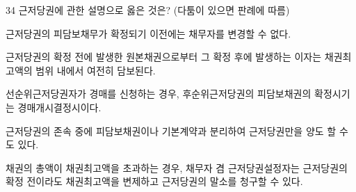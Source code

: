 \begin{question}{34}
근저당권에 관한 설명으로 옳은 것은? (다툼이 있으면 판례에 따름)
\begin{choices}
  \item 근저당권의 피담보채무가 확정되기 이전에는 채무자를 변경할 수 없다.
  \item 근저당권의 확정 전에 발생한 원본채권으로부터 그 확정 후에 발생하는 이자는 채권최고액의 범위 내에서 여전히 담보된다.
  \item 선순위근저당권자가 경매를 신청하는 경우, 후순위근저당권의 피담보채권의 확정시기는 경매개시결정시이다.
  \item 근저당권의 존속 중에 피담보채권이나 기본계약과 분리하여 근저당권만을 양도 할 수도 있다.
  \item 채권의 총액이 채권최고액을 초과하는 경우, 채무자 겸 근저당권설정자는 근저당권의 확정 전이라도 채권최고액을 변제하고 근저당권의 말소를 청구할 수 있다.
\end{choices}
\end{question}
